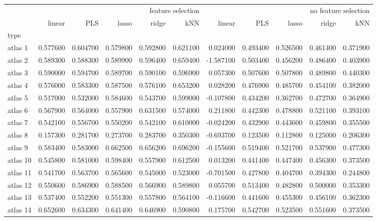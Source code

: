 \documentclass[a4paper]{article}
\begin{document}
\thispagestyle{empty}
\begin{landscape}
\begin{tabular}{lrrrrrrrrrr}
\toprule
 & \multicolumn{5}{r}{feature selection} & \multicolumn{5}{r}{no feature selection} \\
 & linear & PLS & lasso & ridge & kNN & linear & PLS & lasso & ridge & kNN \\
type &  &  &  &  &  &  &  &  &  &  \\
\midrule
atlas 1 & 0.577600 & 0.604700 & 0.579800 & 0.592800 & 0.621100 & 0.024000 & 0.493400 & 0.526500 & 0.461400 & 0.371900 \\
atlas 2 & 0.589300 & 0.588300 & 0.589900 & 0.596400 & 0.659400 & -1.587100 & 0.503400 & 0.456200 & 0.486400 & 0.403900 \\
atlas 3 & 0.590000 & 0.594700 & 0.589700 & 0.590100 & 0.596900 & 0.057300 & 0.507600 & 0.507800 & 0.489800 & 0.440300 \\
atlas 4 & 0.576000 & 0.583300 & 0.587500 & 0.576100 & 0.653200 & 0.028200 & 0.476900 & 0.485700 & 0.454100 & 0.382000 \\
atlas 5 & 0.517000 & 0.532000 & 0.584600 & 0.543700 & 0.599000 & -0.107800 & 0.434200 & 0.362700 & 0.472700 & 0.364900 \\
atlas 6 & 0.567900 & 0.564000 & 0.557900 & 0.631500 & 0.574000 & 0.211800 & 0.442300 & 0.478800 & 0.521100 & 0.393100 \\
atlas 7 & 0.542100 & 0.556700 & 0.550200 & 0.542100 & 0.610000 & -0.024200 & 0.432900 & 0.443600 & 0.459800 & 0.355500 \\
atlas 8 & 0.157300 & 0.281700 & 0.273700 & 0.283700 & 0.350300 & -0.693700 & 0.123500 & 0.112800 & 0.125000 & 0.206300 \\
atlas 9 & 0.583400 & 0.583000 & 0.662500 & 0.656200 & 0.696200 & -0.155600 & 0.519400 & 0.521700 & 0.537900 & 0.477300 \\
atlas 10 & 0.545800 & 0.581000 & 0.598400 & 0.557900 & 0.612500 & 0.013200 & 0.441400 & 0.447400 & 0.456300 & 0.373500 \\
atlas 11 & 0.541700 & 0.563700 & 0.565600 & 0.545000 & 0.523000 & -0.701500 & 0.427800 & 0.404700 & 0.394300 & 0.244800 \\
atlas 12 & 0.550600 & 0.586900 & 0.588500 & 0.566900 & 0.589800 & 0.055700 & 0.513400 & 0.482800 & 0.500000 & 0.353300 \\
atlas 13 & 0.537400 & 0.552200 & 0.551300 & 0.557800 & 0.564100 & -0.116600 & 0.441600 & 0.455300 & 0.456100 & 0.362300 \\
atlas 14 & 0.652600 & 0.634300 & 0.641400 & 0.646900 & 0.590800 & 0.175700 & 0.542700 & 0.523500 & 0.551600 & 0.373500 \\

\end{tabular}
\end{landscape}
\end{document}

